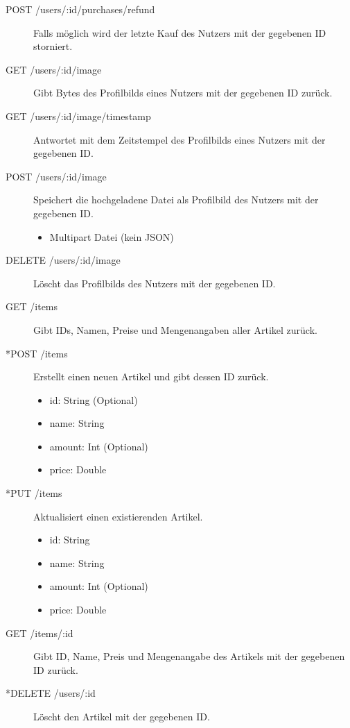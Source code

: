 \documentclass[a4paper, 11pt]{article}
\begin{document}
\begin{description}
	\item[POST /users/:id/purchases/refund] Falls möglich wird der letzte Kauf des Nutzers mit der gegebenen ID storniert.
	
	\item[GET /users/:id/image] Gibt Bytes des Profilbilds eines Nutzers mit der gegebenen ID zurück.
	
	\item[GET /users/:id/image/timestamp] Antwortet mit dem Zeitstempel des Profilbilds eines Nutzers mit der gegebenen ID.
	
	\item[POST /users/:id/image] Speichert die hochgeladene Datei als Profilbild des Nutzers mit der gegebenen ID.
	\begin{itemize}
		\item Multipart Datei (kein JSON)
	\end{itemize}

	\item[DELETE /users/:id/image] Löscht das Profilbilds des Nutzers mit der gegebenen ID.
	
	
	\item[GET /items] Gibt IDs, Namen, Preise und Mengenangaben aller Artikel zurück.

	\item[*POST /items] Erstellt einen neuen Artikel und gibt dessen ID zurück.
	\begin{itemize}
		\item id: String (Optional)
		\item name: String
		\item amount: Int (Optional)
		\item price: Double
	\end{itemize}
	
	\item[*PUT /items] Aktualisiert einen existierenden Artikel.
	\begin{itemize}
		\item id: String
		\item name: String
		\item amount: Int (Optional)
		\item price: Double
	\end{itemize}
	
	\item[GET /items/:id] Gibt ID, Name, Preis und Mengenangabe des Artikels mit der gegebenen ID zurück.
	
	\item[*DELETE /users/:id] Löscht den Artikel mit der gegebenen ID.
\end{description}
\end{document}
